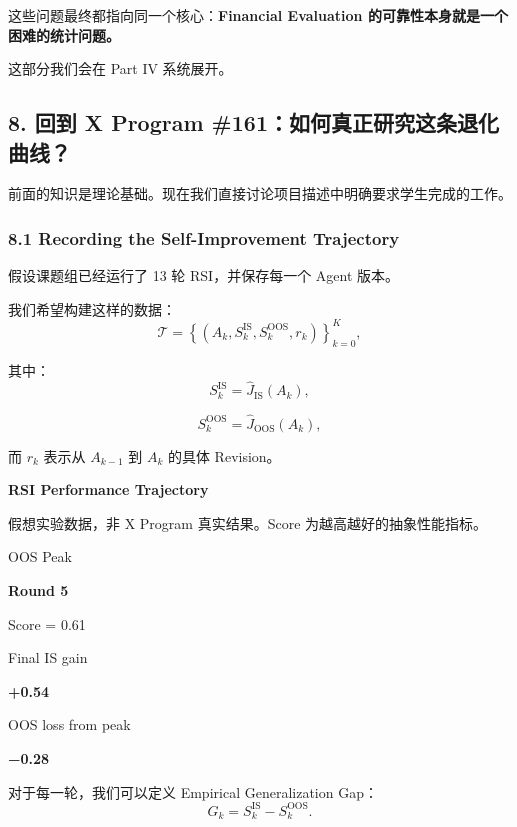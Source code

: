 这些问题最终都指向同一个核心：\textbf{Financial Evaluation 的可靠性本身就是一个困难的统计问题。}

这部分我们会在 Part IV 系统展开。

\hypertarget{part-1-07-0001-ux56deux5230-x-program-161ux5982ux4f55ux771fux6b63ux7814ux7a76ux8fd9ux6761ux9000ux5316ux66f2ux7ebf}{%
\subsection{8. 回到 X Program \#161：如何真正研究这条退化曲线？}\label{part-1-07-0001-ux56deux5230-x-program-161ux5982ux4f55ux771fux6b63ux7814ux7a76ux8fd9ux6761ux9000ux5316ux66f2ux7ebf}}

前面的知识是理论基础。现在我们直接讨论项目描述中明确要求学生完成的工作。

\hypertarget{part-1-07-0001-recording-the-self-improvement-trajectory}{%
\subsubsection{8.1 Recording the Self-Improvement Trajectory}\label{part-1-07-0001-recording-the-self-improvement-trajectory}}

假设课题组已经运行了 13 轮 RSI，并保存每一个 Agent 版本。

我们希望构建这样的数据：
\[\mathcal T=
\left\{
(A_k,S_k^{\mathrm{IS}},S_k^{\mathrm{OOS}},r_k)
\right\}_{k=0}^{K},\]

其中：
\[S_k^{\mathrm{IS}}
=
\widehat J_{\mathrm{IS}}(A_k),\]

\[S_k^{\mathrm{OOS}}
=
\widehat J_{\mathrm{OOS}}(A_k),\]

而 \(r_k\) 表示从 \(A_{k-1}\) 到 \(A_k\) 的具体 Revision。

\textbf{RSI Performance Trajectory}

假想实验数据，非 X Program 真实结果。Score 为越高越好的抽象性能指标。


OOS Peak

\textbf{Round 5}

Score = 0.61

Final IS gain

\textbf{+0.54}

OOS loss from peak

\textbf{−0.28}

对于每一轮，我们可以定义 Empirical Generalization Gap：
\[G_k=S_k^{\mathrm{IS}}-S_k^{\mathrm{OOS}}.\]

